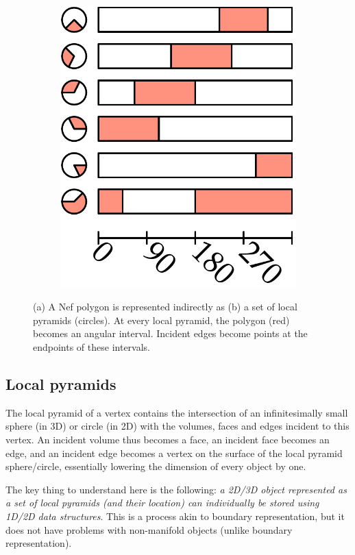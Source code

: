 \begin{figure}
\begin{subfigure}[b]{0.35\linewidth}
\includegraphics[width=\linewidth]{figs/nef-2}
\caption{}%
\end{subfigure}
\caption{(a) A Nef polygon is represented indirectly as (b) a set of local pyramids (circles).
At every local pyramid, the polygon (red) becomes an angular interval.
Incident edges become points at the endpoints of these intervals.}%
\label{fig:nef}
\end{figure}

\subsection{Local pyramids}

The local pyramid of a vertex contains the intersection of an infinitesimally small sphere (in 3D) or circle (in 2D) with the volumes, faces and edges incident to this vertex.
An incident volume thus becomes a face, an incident face becomes an edge, and an incident edge becomes a vertex on the surface of the local pyramid sphere/circle, essentially lowering the dimension of every object by one.

The key thing to understand here is the following: \emph{a 2D/3D object represented as a set of local pyramids (and their location) can individually be stored using 1D/2D data structures}.
This is a process akin to boundary representation, but it does not have problems with non-manifold objects (unlike boundary representation).


